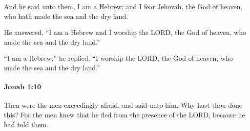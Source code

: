 			\begin{versebox}
					\item[BHS] 
					\item[LXX] 
					\item[ASV] And he said unto them, I am a Hebrew; and I fear Jehovah, the God of heaven, who hath made the sea and the dry land.
					\item[NIV] He answered, “I am a Hebrew and I worship the LORD, the God of heaven, who made the sea and the dry land.”
					\item[NRSV] “I am a Hebrew,” he replied. “I worship the LORD, the God of heaven, who made the sea and the dry land.”
			\end{versebox}

		\paragraph{Jonah 1:10} %
			\label{JONAH-1-10}

			Then were the men exceedingly afraid, and said unto him, Why hast thou done this? For the men knew that he fled from the presence of the LORD, because he had told them.

